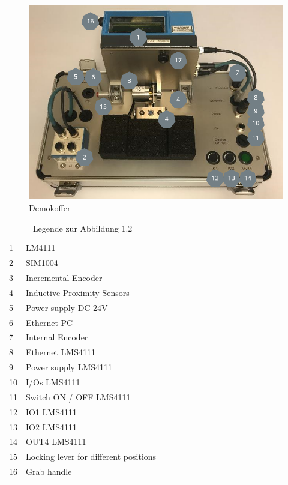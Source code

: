 \begin{figure}[h!]
\centering
\includegraphics[width=13cm]{Bilder/Demokoffer.png}
\caption{Demokoffer}
\label{Demokoffer}
\end{figure}


\begin{table}[h!]

\begin{tabular}{ll}
1  & LM4111                                \\
2  & SIM1004                               \\
3  & Incremental Encoder                   \\
4  & Inductive Proximity Sensors           \\
5  & Power supply DC 24V                   \\
6  & Ethernet PC                           \\
7  & Internal Encoder                      \\
8  & Ethernet LMS4111                      \\
9  & Power supply LMS4111                  \\
10 & I/Os LMS4111                          \\
11 & Switch ON / OFF LMS4111               \\
12 & IO1 LMS4111                           \\
13 & IO2 LMS4111                           \\
14 & OUT4 LMS4111                          \\
15 & Locking lever for different positions \\
16 & Grab handle                          
\end{tabular}
\caption{Legende zur Abbildung 1.2}
\label{Legende zur Abbildung 12}
\end{table}

